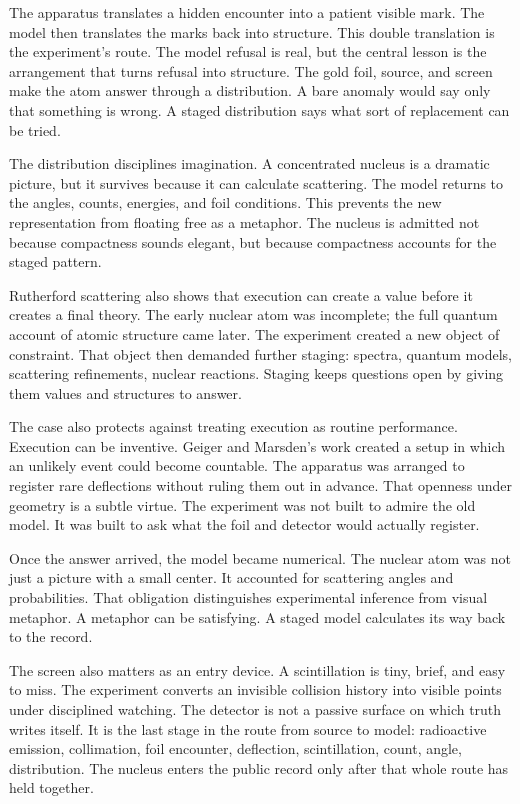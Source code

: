 The apparatus translates a hidden encounter into a patient visible mark.
The model then translates the marks back into structure. This double
translation is the experiment's route. The model refusal is real, but the
central lesson is the arrangement that turns refusal into structure. The
gold foil, source, and screen make the atom answer through a distribution.
A bare anomaly would say only that something is wrong. A staged
distribution says what sort of replacement can be tried.

The distribution disciplines imagination. A concentrated nucleus is a
dramatic picture, but it survives because it can calculate scattering. The
model returns to the angles, counts, energies, and foil conditions. This
prevents the new representation from floating free as a metaphor. The
nucleus is admitted not because compactness sounds elegant, but because
compactness accounts for the staged pattern.

Rutherford scattering also shows that execution can create a value before
it creates a final theory. The early nuclear atom was incomplete; the full
quantum account of atomic structure came later. The experiment created a
new object of constraint. That object then demanded further staging:
spectra, quantum models, scattering refinements, nuclear reactions.
Staging keeps questions open by giving them values and structures to
answer.

The case also protects against treating execution as routine performance.
Execution can be inventive. Geiger and Marsden's work created a setup in
which an unlikely event could become countable. The apparatus was arranged
to register rare deflections without ruling them out in advance. That
openness under geometry is a subtle virtue. The experiment was not built
to admire the old model. It was built to ask what the foil and detector
would actually register.

Once the answer arrived, the model became numerical. The nuclear atom was
not just a picture with a small center. It accounted for scattering angles
and probabilities. That obligation distinguishes experimental inference
from visual metaphor. A metaphor can be satisfying. A staged model
calculates its way back to the record.

The screen also matters as an entry device. A scintillation is tiny,
brief, and easy to miss. The experiment converts an invisible collision
history into visible points under disciplined watching. The detector is
not a passive surface on which truth writes itself. It is the last stage
in the route from source to model: radioactive emission, collimation, foil
encounter, deflection, scintillation, count, angle, distribution. The
nucleus enters the public record only after that whole route has held
together.

